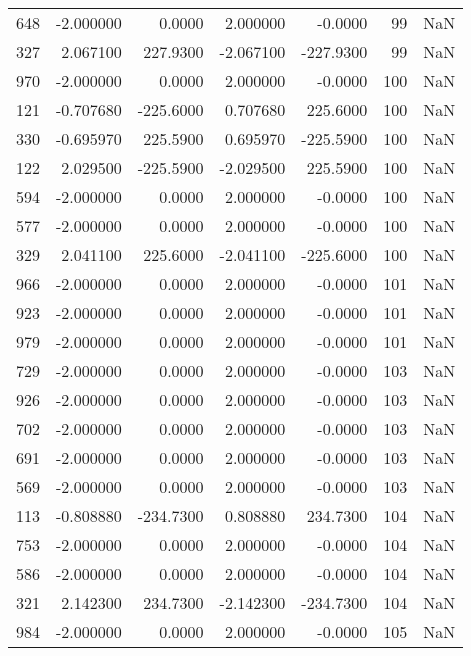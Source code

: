 \begin{tabular}{rrrrrrr}
 648 &   -2.000000 &    0.0000 &    2.000000 &     -0.0000 &          99 & NaN \\
 327 &    2.067100 &  227.9300 &   -2.067100 &   -227.9300 &          99 & NaN \\
 970 &   -2.000000 &    0.0000 &    2.000000 &     -0.0000 &         100 & NaN \\
 121 &   -0.707680 & -225.6000 &    0.707680 &    225.6000 &         100 & NaN \\
 330 &   -0.695970 &  225.5900 &    0.695970 &   -225.5900 &         100 & NaN \\
 122 &    2.029500 & -225.5900 &   -2.029500 &    225.5900 &         100 & NaN \\
 594 &   -2.000000 &    0.0000 &    2.000000 &     -0.0000 &         100 & NaN \\
 577 &   -2.000000 &    0.0000 &    2.000000 &     -0.0000 &         100 & NaN \\
 329 &    2.041100 &  225.6000 &   -2.041100 &   -225.6000 &         100 & NaN \\
 966 &   -2.000000 &    0.0000 &    2.000000 &     -0.0000 &         101 & NaN \\
 923 &   -2.000000 &    0.0000 &    2.000000 &     -0.0000 &         101 & NaN \\
 979 &   -2.000000 &    0.0000 &    2.000000 &     -0.0000 &         101 & NaN \\
 729 &   -2.000000 &    0.0000 &    2.000000 &     -0.0000 &         103 & NaN \\
 926 &   -2.000000 &    0.0000 &    2.000000 &     -0.0000 &         103 & NaN \\
 702 &   -2.000000 &    0.0000 &    2.000000 &     -0.0000 &         103 & NaN \\
 691 &   -2.000000 &    0.0000 &    2.000000 &     -0.0000 &         103 & NaN \\
 569 &   -2.000000 &    0.0000 &    2.000000 &     -0.0000 &         103 & NaN \\
 113 &   -0.808880 & -234.7300 &    0.808880 &    234.7300 &         104 & NaN \\
 753 &   -2.000000 &    0.0000 &    2.000000 &     -0.0000 &         104 & NaN \\
 586 &   -2.000000 &    0.0000 &    2.000000 &     -0.0000 &         104 & NaN \\
 321 &    2.142300 &  234.7300 &   -2.142300 &   -234.7300 &         104 & NaN \\
 984 &   -2.000000 &    0.0000 &    2.000000 &     -0.0000 &         105 & NaN \\

\end{tabular}
